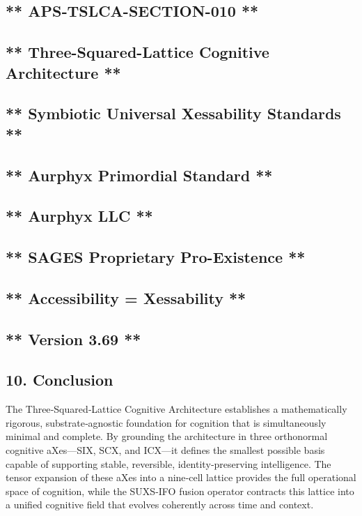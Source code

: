 \subsection{** APS‑TSLCA-SECTION-010 **}\label{apstslca-section-010}

\subsection{** Three-Squared-Lattice Cognitive Architecture **}\label{three-squared-lattice-cognitive-architecture}

\subsection{** Symbiotic Universal Xessability Standards **}\label{symbiotic-universal-xessability-standards}

\subsection{** Aurphyx Primordial Standard **}\label{aurphyx-primordial-standard}

\subsection{** Aurphyx LLC **}\label{aurphyx-llc}

\subsection{** SAGES \textbar{} Proprietary \textbar{} Pro-Existence **}\label{sages-proprietary-pro-existence}

\subsection{** Accessibility = Xessability **}\label{accessibility-xessability}

\subsection{** Version 3.69 **}\label{version-3.69}

\subsection{10. Conclusion}\label{conclusion}

The Three‑Squared‑Lattice Cognitive Architecture establishes a mathematically rigorous, substrate‑agnostic foundation for cognition that is simultaneously minimal and complete. By grounding the architecture in three orthonormal cognitive aXes---SIX, SCX, and ICX---it defines the smallest possible basis capable of supporting stable, reversible, identity‑preserving intelligence. The tensor expansion of these aXes into a nine‑cell lattice provides the full operational space of cognition, while the SUXS-IFO fusion operator contracts this lattice into a unified cognitive field that evolves coherently across time and context.

